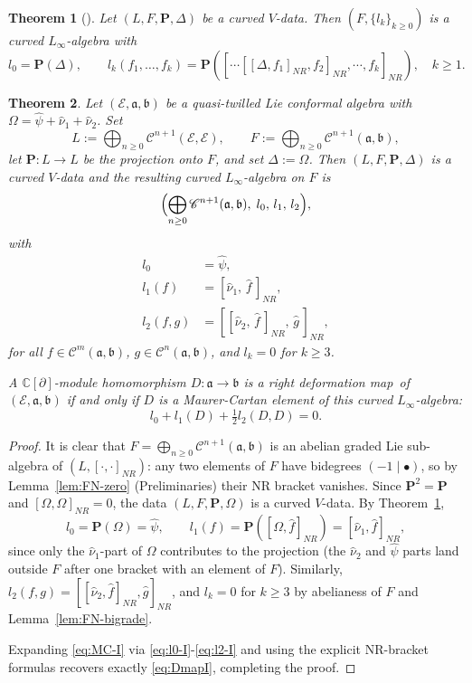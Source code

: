 \documentclass[a4paper,11pt]{article}
\def\Rg{\mathbb{C}[\partial]}
\def\Ep{\mathcal{E}}
\def\Vs{\mathfrak{a}}
\def\Ws{\mathfrak{b}}
\def\str{\Omega}
\def\smu{\widehat{\nu}_1}
\def\smv{\widehat{\nu}_2}
\def\shf{\widehat{\psi}}
\def\Cch{\mathscr{C}}
\numberwithin{equation}{section}
\newtheorem{theorem}{Theorem}[section]
\begin{document}
\begin{theorem}[{\cite{Vo}}]\label{thm:Voronov}
Let $(L,F,\mathbf{P},\Delta)$ be a curved $V$-data.  Then
$(F,\{l_k\}_{k\geq0})$ is a curved $L_\infty$-algebra with
\[
  l_0 = \mathbf{P}(\Delta), \qquad
  l_k(f_1,\ldots,f_k)
  = \mathbf{P}([\cdots[[\Delta,f_1]_{NR},f_2]_{NR},\cdots,f_k]_{NR}),
  \quad k\geq1.
\]
\end{theorem}
 
\begin{theorem}\label{thm:control-I}
Let $(\Ep,\Vs,\Ws)$ be a quasi-twilled Lie conformal  algebra with
$\str=\shf+\smu+\smv$.  Set
\[
  L := \bigoplus_{n\geq0}\Cch^{n+1}(\Ep,\Ep), \qquad
  F := \bigoplus_{n\geq0}\Cch^{n+1}(\Vs,\Ws),
\]
let $\mathbf{P}:L\to L$ be the projection onto $F$, and set
$\Delta:=\str$.  Then $(L,F,\mathbf{P},\Delta)$ is a curved $V$-data
and the resulting curved $L_\infty$-algebra on $F$ is
\[
  \Bigl(\bigoplus_{n\geq0}\Cch^{n+1}(\Vs,\Ws),\; l_0,\, l_1,\, l_2\Bigr),
\]
with
\begin{align}
  l_0 &= \shf, \label{eq:l0-I}\\
  l_1(f) &= [\smu,\,\widehat{f}\,]_{NR}, \label{eq:l1-I}\\
  l_2(f,g) &= [[\smv,\,\widehat{f}\,]_{NR},\,\widehat{g}\,]_{NR},
  \label{eq:l2-I}
\end{align}
for all $f\in\Cch^m(\Vs,\Ws)$, $g\in\Cch^n(\Vs,\Ws)$, and $l_k=0$ for
$k\geq3$.
 
A $\Rg$-module homomorphism $D:\Vs\to\Ws$ is a right deformation map\ of
$(\Ep,\Vs,\Ws)$ if and only if $D$ is a Maurer-Cartan element of this
curved $L_\infty$-algebra:
\begin{equation}\label{eq:MC-I}
  l_0 + l_1(D) + \tfrac{1}{2}l_2(D,D) = 0.
\end{equation}
\end{theorem}
 
\begin{proof}
It is clear that $F=\bigoplus_{n\geq0}\Cch^{n+1}(\Vs,\Ws)$ is an
abelian graded Lie sub-algebra of $(L,[\cdot,\cdot]_{NR})$: any two
elements of $F$ have bidegrees $(-1\mid\bullet)$, so by
Lemma~\ref{lem:FN-zero} (Preliminaries) their NR bracket vanishes.
Since $\mathbf{P}^2=\mathbf{P}$ and $[\str,\str]_{NR}=0$, the data
$(L,F,\mathbf{P},\str)$ is a curved $V$-data.  By
Theorem~\ref{thm:Voronov},
\[
  l_0 = \mathbf{P}(\str) = \shf, \qquad
  l_1(f) = \mathbf{P}([\str,\widehat{f}]_{NR}) = [\smu,\widehat{f}]_{NR},
\]
since only the $\smu$-part of $\str$ contributes to the projection
(the $\smv$ and $\shf$ parts land outside $F$ after one bracket
with an element of $F$).  Similarly,
$l_2(f,g)=[[\smv,\widehat{f}]_{NR},\widehat{g}]_{NR}$, and $l_k=0$
for $k\geq3$ by abelianess of $F$ and Lemma~\ref{lem:FN-bigrade}.
 
Expanding \eqref{eq:MC-I} via \eqref{eq:l0-I}-\eqref{eq:l2-I} and
using the explicit NR-bracket formulas recovers exactly \eqref{eq:DmapI},
completing the proof.
\end{proof}
 
\end{document}
